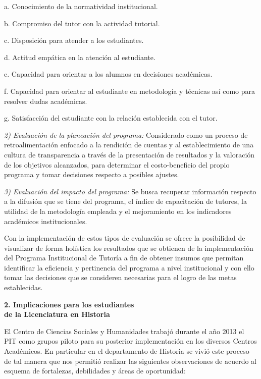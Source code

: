\begin{Obs}
\item[a.] Conocimiento de la normatividad institucional.
\item[b.] Compromiso del tutor con la actividad tutorial.
\item[c.] Disposición para atender a los estudiantes.
\item[d.] Actitud empática en la atención al estudiante.
\item[e.] Capacidad para orientar a los alumnos en decisiones académicas.
\item[f.] Capacidad para orientar al estudiante en metodología y técnicas así como
para resolver dudas académicas.
\item[g.] Satisfacción del estudiante con la relación establecida con el tutor.
\end{Obs}

\textit{2) Evaluación de la planeación del programa:} Considerado como un
proceso de retroalimentación enfocado a la rendición de cuentas y al\linebreak
establecimiento de una cultura de transparencia a través de la presentación
de resultados y la valoración de los objetivos alcanzados, para determinar
el costo-beneficio del propio programa y tomar decisiones respecto a
posibles ajustes.


\textit{3) Evaluación del impacto del programa:} Se busca recuperar
información respecto a la difusión que se tiene del programa, el índice de
capacitación de tutores, la utilidad de la metodología empleada y el
mejoramiento en los indicadores académicos institucionales.

Con la implementación de estos tipos de evaluación se ofrece la posibilidad
de visualizar de forma holística los resultados que se obtienen de la
implementación del Programa Institucional de Tutoría a fin de obtener
insumos que permitan identificar la eficiencia y pertinencia del programa a
nivel institucional y con ello tomar las decisiones que se consideren
necesarias para el logro de las metas establecidas.


\medskip
{\bfseries 2. Implicaciones para los estudiantes\\ de la Licenciatura en Historia}

El Centro de Ciencias Sociales y Humanidades trabajó durante el año 2013  el
PIT como grupos piloto para su posterior implementación en los diversos
Centros Académicos. En particular en el departamento de Historia se vivió
este proceso de tal manera que nos permitió realizar las siguientes
observaciones de acuerdo al esquema de fortalezas, debilidades y áreas de
oportunidad:

